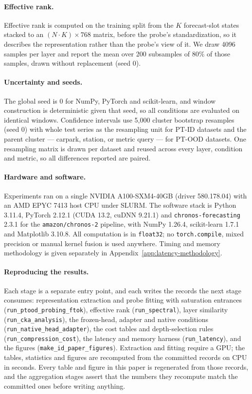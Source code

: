 \paragraph{Effective rank.}
Effective rank is computed on the training split from the \(K\) forecast-slot states stacked to an
\((N \cdot K) \times 768\) matrix, before the probe's standardization, so it describes the
representation rather than the probe's view of it. We draw 4096 samples per layer and report the
mean over 200 subsamples of 80\% of those samples, drawn without replacement (seed 0).

\paragraph{Uncertainty and seeds.}
The global seed is 0 for NumPy, PyTorch and scikit-learn, and window construction is deterministic
given that seed, so all conditions are evaluated on identical windows. Confidence intervals use
5,000 cluster bootstrap resamples (seed 0) with whole test series as the resampling unit for PT-ID
datasets and the parent cluster --- carpark, station, or metric query --- for PT-OOD datasets. One
resampling matrix is drawn per dataset and reused across every layer, condition and metric, so all
differences reported are paired.

\paragraph{Hardware and software.}
Experiments ran on a single NVIDIA A100-SXM4-40GB (driver 580.178.04) with an AMD EPYC 7413 host
CPU under SLURM. The software stack is Python 3.11.4, PyTorch 2.12.1 (CUDA 13.2, cuDNN 9.21.1) and
\texttt{chronos-forecasting} 2.3.1 for the \texttt{amazon/chronos-2} pipeline, with NumPy 1.26.4,
scikit-learn 1.7.1 and Matplotlib 3.10.8. All computation is in \texttt{float32}; no
\texttt{torch.compile}, mixed precision or manual kernel fusion is used anywhere. Timing and memory
methodology is given separately in Appendix~\ref{app:latency-methodology}.

\paragraph{Reproducing the results.}
Each stage is a separate entry point, and each writes the records the next stage consumes:
representation extraction and probe fitting with saturation entrances
(\texttt{run\_ptood\_probing\_ftok}), effective rank (\texttt{run\_spectral}), layer similarity
(\texttt{run\_cka\_analysis}), the frozen-head, adapter and native conditions
(\texttt{run\_native\_head\_adapter}), the cost tables and depth-selection rules
(\texttt{run\_compression\_cost}), the latency and memory harness (\texttt{run\_latency}), and the
figures (\texttt{make\_id\_paper\_figures}). Extraction and fitting require a GPU; the tables,
statistics and figures are recomputed from the committed records on CPU in seconds. Every table and
figure in this paper is regenerated from those records, and the aggregation stages assert that the
numbers they recompute match the committed ones before writing anything.

